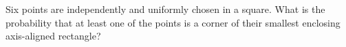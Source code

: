 Six points are independently and uniformly chosen in a square. What is the probability that at least one of the points is a corner of their smallest enclosing axis-aligned rectangle?
